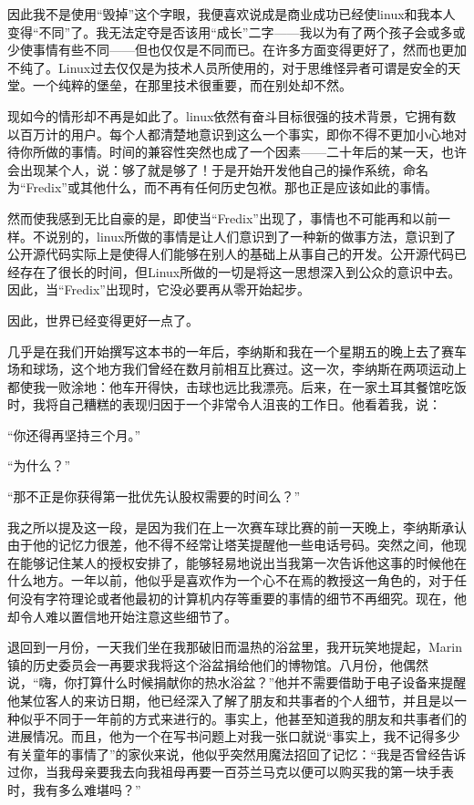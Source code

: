 因此我不是使用“毁掉”这个字眼，我便喜欢说成是商业成功已经使linux和我本人变得“不同”了。我无法定夺是否该用“成长”二字——我以为有了两个孩子会或多或少使事情有些不同——但也仅仅是不同而已。在许多方面变得更好了，然而也更加不纯了。Linux过去仅仅是为技术人员所使用的，对于思维怪异者可谓是安全的天堂。一个纯粹的堡垒，在那里技术很重要，而在别处却不然。

现如今的情形却不再是如此了。linux依然有奋斗目标很强的技术背景，它拥有数以百万计的用户。每个人都清楚地意识到这么一个事实，即你不得不更加小心地对待你所做的事情。时间的兼容性突然也成了一个因素——二十年后的某一天，也许会出现某个人，说：够了就是够了！于是开始开发他自己的操作系统，命名为“Fredix”或其他什么，而不再有任何历史包袱。那也正是应该如此的事情。

然而使我感到无比自豪的是，即使当“Fredix”出现了，事情也不可能再和以前一样。不说别的，linux所做的事情是让人们意识到了一种新的做事方法，意识到了公开源代码实际上是使得人们能够在别人的基础上从事自己的开发。公开源代码已经存在了很长的时间，但Linux所做的一切是将这一思想深入到公众的意识中去。因此，当“Fredix”出现时，它没必要再从零开始起步。

因此，世界已经变得更好一点了。

 

几乎是在我们开始撰写这本书的一年后，李纳斯和我在一个星期五的晚上去了赛车场和球场，这个地方我们曾经在数月前相互比赛过。这一次，李纳斯在两项运动上都使我一败涂地：他车开得快，击球也远比我漂亮。后来，在一家土耳其餐馆吃饭时，我将自己糟糕的表现归因于一个非常令人沮丧的工作日。他看着我，说：

“你还得再坚持三个月。”

“为什么？”

“那不正是你获得第一批优先认股权需要的时间么？”

我之所以提及这一段，是因为我们在上一次赛车球比赛的前一天晚上，李纳斯承认由于他的记忆力很差，他不得不经常让塔芙提醒他一些电话号码。突然之间，他现在能够记住某人的授权安排了，能够轻易地说出当我第一次告诉他这事的时候他在什么地方。一年以前，他似乎是喜欢作为一个心不在焉的教授这一角色的，对于任何没有字符理论或者他最初的计算机内存等重要的事情的细节不再细究。现在，他却令人难以置信地开始注意这些细节了。

退回到一月份，一天我们坐在我那破旧而温热的浴盆里，我开玩笑地提起，Marin镇的历史委员会一再要求我将这个浴盆捐给他们的博物馆。八月份，他偶然说，“嗨，你打算什么时候捐献你的热水浴盆？”他并不需要借助于电子设备来提醒他某位客人的来访日期，他已经深入了解了朋友和共事者的个人细节，并且是以一种似乎不同于一年前的方式来进行的。事实上，他甚至知道我的朋友和共事者们的进展情况。而且，他为一个在写书问题上对我一张口就说“事实上，我不记得多少有关童年的事情了”的家伙来说，他似乎突然用魔法招回了记忆：“我是否曾经告诉过你，当我母亲要我去向我祖母再要一百芬兰马克以便可以购买我的第一块手表时，我有多么难堪吗？”

